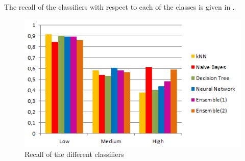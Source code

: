\noindent The recall of the classifiers with respect to each of the classes is given in
.

\begin{figure}[h]
	\centering
	\includegraphics[width=\columnwidth]{../../charts/recall.png}
	\caption{Recall of the different classifiers}
	\label{fig:recall}
\end{figure}




